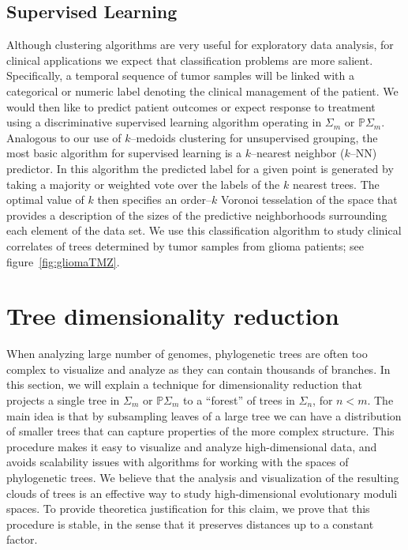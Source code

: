 \documentclass[a4paper,11pt]{article}
\begin{document}
\subsection{Supervised Learning}

Although clustering algorithms are very useful for exploratory data analysis, for clinical applications we expect that classification problems are more salient.
Specifically, a temporal sequence of tumor samples will be linked with a categorical or numeric label denoting the clinical management of the patient.
We would then like to predict patient outcomes or expect response to treatment using a discriminative supervised learning algorithm operating in $\Sigma_m$ or $\mathbb{P}\Sigma_m$.
Analogous to our use of $k$--medoids clustering for unsupervised grouping, the most basic algorithm for supervised learning is a $k$--nearest neighbor ($k$--NN) predictor.
In this algorithm the predicted label for a given point is generated by taking a majority or weighted vote over the labels of the $k$ nearest trees.
The optimal value of $k$ then specifies an order--$k$ Voronoi
tesselation of the space that provides a description of the sizes of
the predictive neighborhoods surrounding each element of the data
set.  We use this classification algorithm to study clinical
correlates of trees determined by tumor samples from glioma patients;
see figure~\ref{fig:gliomaTMZ}.


\section{Tree dimensionality reduction}\label{sec:treedimred}

When analyzing large number of genomes, phylogenetic trees are often
too complex to visualize and analyze as they can contain thousands of
branches.  In this section, we will explain a technique for
dimensionality reduction that projects a single tree in $\Sigma_m$ or
$\mathbb{P}\Sigma_m$ to a ``forest'' of trees in $\Sigma_{n}$, for $n
< m$.  The main idea is that by subsampling leaves of a large tree we
can have a distribution of smaller trees that can capture properties
of the more complex structure.  This procedure makes it easy to
visualize and analyze high-dimensional data, and avoids scalability
issues with algorithms for working with the spaces of phylogenetic
trees.  We believe that the analysis and visualization of the
resulting clouds of trees is an effective way to study
high-dimensional evolutionary moduli spaces.  To provide theoretica
justification for this claim, we prove that this procedure is stable,
in the sense that it preserves distances up to a constant factor.
\end{document}
